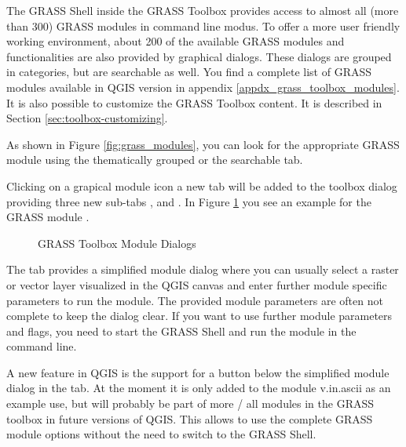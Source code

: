 The GRASS Shell inside the GRASS Toolbox provides access to almost all (more
than 300) GRASS modules in command line modus. To offer a more user
friendly working environment, about 200 of the available GRASS modules and
functionalities are also provided by graphical dialogs. These dialogs are
grouped in categories, but are searchable as well. You find a complete
list of GRASS modules available in QGIS version \CURRENT
in appendix \ref{appdx_grass_toolbox_modules}. It is also possible to
customize the GRASS Toolbox content. It is described in Section
\ref{sec:toolbox-customizing}.

As shown in Figure \ref{fig:grass_modules}, you can look for the appropriate
GRASS module using the thematically grouped  or the
searchable  tab.

Clicking on a grapical module icon a new tab will be added to the toolbox
dialog providing three new sub-tabs ,  and
. In Figure \ref{fig:grass_module_dialog} you see an example
for the GRASS module .

\begin{figure}[h]
\centering
   \hspace{1cm}
   \hspace{1cm}
\caption{GRASS Toolbox Module Dialogs \nixcaption}\label{fig:grass_module_dialog}
\end{figure}
\FloatBarrier
{}

The  tab provides a simplified module dialog where you can
usually select a raster or vector layer visualized in the QGIS canvas and
enter further module specific parameters to run the module. The provided
module parameters are often not complete to keep the dialog clear. If you want
to use further module parameters and flags, you need to start the GRASS Shell
and run the module in the command line.

A new feature in QGIS \CURRENT is the support for a
 button below the simplified module dialog
in the  tab. At the moment it is only added to the module v.in.ascii
as an example use, but will probably be part of more / all modules in the
GRASS toolbox in future versions of QGIS. This allows to use the complete GRASS
module options without the need to switch to the GRASS Shell.

